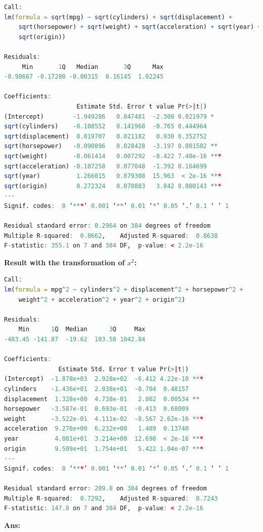 \documentclass[twoside]{homework}
\begin{document}
\begin{lstlisting}[language=R]
Call:
lm(formula = sqrt(mpg) ~ sqrt(cylinders) + sqrt(displacement) + 
    sqrt(horsepower) + sqrt(weight) + sqrt(acceleration) + sqrt(year) + 
    sqrt(origin))

Residuals:
     Min       1Q   Median       3Q      Max 
-0.98667 -0.17280 -0.00315  0.16145  1.02245 

Coefficients:
                    Estimate Std. Error t value Pr(>|t|)    
(Intercept)        -1.949286   0.847481  -2.300 0.021979 *  
sqrt(cylinders)    -0.108552   0.141968  -0.765 0.444964    
sqrt(displacement)  0.019707   0.021182   0.930 0.352752    
sqrt(horsepower)   -0.090896   0.028428  -3.197 0.001502 ** 
sqrt(weight)       -0.061414   0.007292  -8.422 7.48e-16 ***
sqrt(acceleration) -0.107258   0.077048  -1.392 0.164699    
sqrt(year)          1.266015   0.079308  15.963  < 2e-16 ***
sqrt(origin)        0.272324   0.070883   3.842 0.000143 ***
---
Signif. codes:  0 ‘***’ 0.001 ‘**’ 0.01 ‘*’ 0.05 ‘.’ 0.1 ‘ ’ 1

Residual standard error: 0.2964 on 384 degrees of freedom
Multiple R-squared:  0.8662,	Adjusted R-squared:  0.8638 
F-statistic: 355.1 on 7 and 384 DF,  p-value: < 2.2e-16
\end{lstlisting}
\textbf{Result with the transformation of $x^2$:}
\begin{lstlisting}[language=R]
Call:
lm(formula = mpg^2 ~ cylinders^2 + displacement^2 + horsepower^2 + 
    weight^2 + acceleration^2 + year^2 + origin^2)

Residuals:
    Min      1Q  Median      3Q     Max 
-483.45 -141.87  -19.62  103.58 1042.84 

Coefficients:
               Estimate Std. Error t value Pr(>|t|)    
(Intercept)  -1.878e+03  2.928e+02  -6.412 4.22e-10 ***
cylinders    -1.436e+01  2.038e+01  -0.704  0.48157    
displacement  1.328e+00  4.738e-01   2.802  0.00534 ** 
horsepower   -3.587e-01  8.693e-01  -0.413  0.68009    
weight       -3.522e-01  4.111e-02  -8.567 2.62e-16 ***
acceleration  9.278e+00  6.232e+00   1.489  0.13740    
year          4.081e+01  3.214e+00  12.698  < 2e-16 ***
origin        9.509e+01  1.754e+01   5.422 1.04e-07 ***
---
Signif. codes:  0 ‘***’ 0.001 ‘**’ 0.01 ‘*’ 0.05 ‘.’ 0.1 ‘ ’ 1

Residual standard error: 209.8 on 384 degrees of freedom
Multiple R-squared:  0.7292,	Adjusted R-squared:  0.7243 
F-statistic: 147.8 on 7 and 384 DF,  p-value: < 2.2e-16
\end{lstlisting}
\textbf{Ans:}\\
\end{document}
